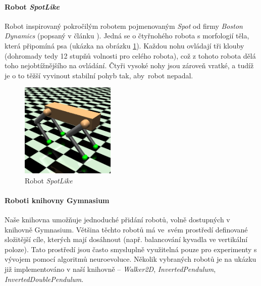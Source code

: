 \paragraph{Robot \emph{SpotLike}} \label{imp:robots.Spot}
Robot inspirovaný pokročilým robotem pojmenovaným \emph{Spot} od firmy
\emph{Boston Dynamics} (popsaný v článku \citep{guizzo2019leaps}). Jedná se o
čtyřnohého robota s morfologií těla, která připomíná psa (ukázka na obrázku
\ref{imp:fig:robots.SpotLike}). Každou nohu ovládají tři klouby (dohromady tedy
12 stupňů volnosti pro celého robota), což z tohoto robota dělá toho
nejobtížnějšího na ovládání. Čtyři vysoké nohy jsou zároveň vratké, a tudíž je
o to těžší vyvinout stabilní pohyb tak, aby~robot nepadal.

\begin{figure}[!htb]
    \centering
    \includegraphics[width=0.4\textwidth]{../img/crop_SpotLike.jpg}
    \caption{Robot \emph{SpotLike}}
    \label{imp:fig:robots.SpotLike}
\end{figure}

\paragraph{}

\paragraph{Roboti knihovny Gymnasium}
Naše knihovna umožňuje jednoduché přidání robotů, volně dostupných v knihovně
Gymnasium. Většina těchto robotů má ve~svém prostředí definované složitější
cíle, kterých mají dosáhnout (např. balancování kyvadla ve vertikální poloze).
Tato prostředí jsou často smysluplně využitelná pouze pro experimenty s vývojem
pomocí algoritmů neuroevoluce. Několik vybraných robotů je na ukázku již
implementováno v naší knihovně -- \emph{Walker2D}, \emph{InvertedPendulum},
\emph{InvertedDoublePendulum}.

